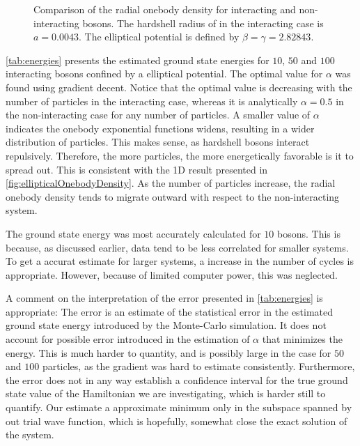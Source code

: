 \begin{figure}
\begin{subfigure}{\textwidth}
	\end{subfigure}%
	\centering
	\caption{Comparison of the radial onebody density for interacting and non-interacting bosons. The hardshell radius of in the interacting case is $a = 0.0043$. The elliptical potential is defined by $\beta = \gamma =  2.82843$. }
	\label{fig:ellipticalOnebodyDensity}
\end{figure}

\autoref{tab:energies} presents the estimated ground state energies for $10$,
$50$ and $100$ interacting bosons confined by a elliptical potential. The
optimal value for $\alpha$ was found using gradient decent. Notice that the
optimal value is decreasing with the number of particles in the interacting
case, whereas it is analytically $\alpha = 0.5$ in the non-interacting case for
any number of particles. A smaller value of $\alpha$ indicates the onebody
exponential functions widens, resulting in a wider distribution of particles.
This makes sense, as hardshell bosons interact repulsively. Therefore, the more
particles, the more energetically favorable is it to spread out. This is
consistent with the 1D result presented in
\autoref{fig:ellipticalOnebodyDensity}. As the number of particles increase, the
radial onebody density tends to migrate outward with respect to the
non-interacting system.


The ground state energy was most accurately calculated for $10$ bosons. This is
because, as discussed earlier, data tend to be less correlated for smaller
systems. To get a accurat estimate for larger systems, a increase in the number
of cycles is appropriate. However, because of limited computer power, this was
neglected.


A comment on the interpretation of the error presented in \autoref{tab:energies} is appropriate:
The error is an estimate of the statistical error in the estimated ground state
energy introduced by the Monte-Carlo simulation. It does not account for
possible error introduced in the estimation of $\alpha$ that minimizes the
energy. This is much harder to quantity, and is possibly large in the case for
$50$ and $100$ particles, as the gradient was hard to estimate consistently.
Furthermore, the error does not in any way establish a confidence interval for
the true ground state value of the Hamiltonian we are investigating, which is
harder still to quantify. Our estimate a approximate minimum only in the
subspace spanned by out trial wave function, which is hopefully, somewhat close
the exact solution of the system.







